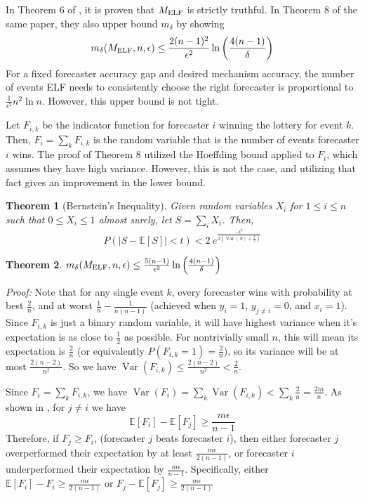 \documentclass[letterpaper,12pt]{article}
\DeclareMathOperator*{\Var}{Var}
\newcommand{\E}{\mathbb{E}}
\newcommand{\1}{\mathbbm{1}}
\newtheorem{theorem}{Theorem}
\begin{document}
In Theorem 6 of \cite{witkowski2018incentive}, it is proven that $M_{\mathrm{ELF}}$ is strictly truthful. In Theorem 8 of the same paper, they also upper bound $m_\delta$ by showing 
\[ m_\delta(M_{\mathrm{ELF}}, n, \epsilon) \leq \frac{2(n-1)^2}{\epsilon^2} \ln \left(\frac{4(n-1)}{\delta}\right)\]
For a fixed forecaster accuracy gap and desired mechanism accuracy, the number of events ELF needs to consistently choose the right forecaster is proportional to $\frac{1}{\epsilon^2} n^2 \ln n$. However, this upper bound is not tight. 

Let $F_{i, k}$ be the indicator function for forecaster $i$ winning the lottery for event $k$. Then, $F_i = \sum_k F_{i, k}$ is the random variable that is the number of events forecaster $i$ wins. The proof of Theorem 8 \cite{witkowski2018incentive} utilized the Hoeffding bound applied to $F_i$, which assumes they have high variance. However, this is not the case, and utilizing that fact gives an improvement in the lower bound. 
\begin{theorem}[Bernstein's Inequality]
  \label{bernstein}
  Given random variables $X_i$ for $1 \leq i \leq n$ such that $0 \leq X_i \leq 1$ almost surely, let $S = \sum_i X_i$. Then,
  \[ P\left(|S - \E[S]| < t\right) < 2 \: e^{\frac{-t^2 }{2\left(\Var(S) + \frac{t}{3}\right)} } \]
\end{theorem}
\begin{theorem}
  \label{elf_bound}
    $m_\delta(M_{\mathrm{ELF}}, n, \epsilon) \leq \frac{5(n-1)}{\epsilon^2}\ln\left(\frac{4(n-1)}{\delta}\right)$
\end{theorem}
\emph{Proof:} Note that for any single event $k$, every forecaster wins with probability at best $\frac{2}{n}$, and at worst $\frac{1}{n} - \frac{1}{n(n-1)}$ (achieved when $y_i = 1$, $y_{j\neq i} = 0$, and $x_i = 1$). Since $F_{i, k}$ is just a binary random variable, it will have highest variance when it's expectation is as close to $\frac{1}{2}$ as possible. For nontrivially small $n$, this will mean its expectation is $\frac{2}{n}$ (or equivalently $P(F_{i, k} = 1) = \frac{2}{n}$), so its variance will be at most $\frac{2(n-2)}{n^2}$. So we have $\Var(F_{i, k}) \leq \frac{2(n-2)}{n^2} < \frac{2}{n}$. 

Since $F_i = \sum_k F_{i, k}$, we have $\Var(F_i) = \sum_k \Var(F_{i, k}) < \sum_k \frac{2}{n} = \frac{2m}{n}$. As shown in \citet{witkowski2018incentive}, for $j\neq i$ we have 
\[ \E[F_i] - \E[F_j] \geq \frac{m \epsilon}{n - 1}\]
Therefore, if $F_j \geq F_i$, (forecaster $j$ beats forecaster $i$), then either forecaster $j$ overperformed their expectation by at least $\frac{m \epsilon}{2(n - 1)}$, or forecaster $i$ underperformed their expectation by $\frac{m \epsilon}{n - 1}$. Specifically, either $\E[F_i] - F_i \geq \frac{m \epsilon}{2(n - 1)}$ or $F_j - \E[F_j] \geq \frac{m \epsilon}{2(n - 1)}$
\end{document}
